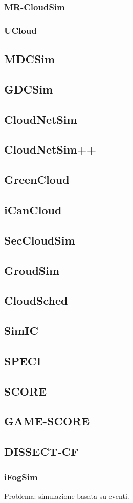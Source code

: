{\subsubsection*{MR-CloudSim}
\subsubsection*{UCloud}

\subsection*{MDCSim}
\subsection*{GDCSim}
\subsection*{CloudNetSim}
\subsection*{CloudNetSim++}
\subsection*{GreenCloud}
\subsection*{iCanCloud}
\subsection*{SecCloudSim}
\subsection*{GroudSim}
\subsection*{CloudSched}
\subsection*{SimIC}
\subsection*{SPECI}
\subsection*{SCORE}
\subsection*{GAME-SCORE}
\subsection*{DISSECT-CF}
\subsubsection*{iFogSim}
Problema: simulazione basata su eventi.
}